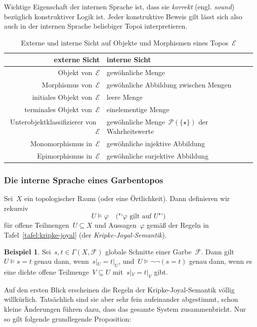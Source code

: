 \documentclass[a4paper,ngerman,12pt]{scrartcl}
\theoremstyle{definition}
\newtheorem{bsp}[defn]{Beispiel}
\theoremstyle{plain}
\theoremstyle{remark}
\newcommand{\E}{\mathcal{E}}
\newcommand{\F}{\mathcal{F}}
\renewcommand{\P}{\mathcal{P}}
\renewcommand{\_}{\mathpunct{.}\,}
\newcommand{\?}{\,{:}\,}
\begin{document}
Wichtige Eigenschaft der internen Sprache ist, dass sie \emph{korrekt} (engl.
\emph{sound}) bezüglich konstruktiver Logik ist. Jeder konstruktive Beweis gilt
lässt sich also auch in der internen Sprache beliebiger Topoi interpretieren.

\begin{table}
  \centering
  \small
  \setlength{\extrarowheight}{0.3em}
  \begin{tabular}{@{}r|l@{}}
    externe Sicht & interne Sicht
    \\\hline
    Objekt von~$\E$ & gewöhnliche Menge \\
    Morphismus von~$\E$ & gewöhnliche Abbildung zwischen Mengen \\
    initiales Objekt von~$\E$ & leere Menge \\
    terminales Objekt von~$\E$ & einelementige Menge \\
    Unterobjektklassifizierer von~$\E$ & gewöhnliche Menge~$\P(\{\star\})$ der
    Wahrheitswerte \\
    Monomorphismus in~$\E$ & gewöhnliche injektive Abbildung \\
    Epimorphismus in~$\E$ & gewöhnliche surjektive Abbildung
  \end{tabular}
  \caption{\label{tafel:externintern}Externe und interne Sicht auf Objekte und
  Morphismen eines Topos~$\E$}
\end{table}


\subsubsection*{Die interne Sprache eines Garbentopos}

Sei~$X$ ein topologischer Raum (oder eine Örtlichkeit). Dann definieren wir rekursiv
\[ U \models \varphi \quad \text{("`$\varphi$ gilt auf~$U$"')} \]
für offene Teilmengen~$U \subseteq X$ und Aussagen~$\varphi$ gemäß
der Regeln in Tafel~\ref{tafel:kripke-joyal} (der
\emph{Kripke-Joyal-Semantik}).

\begin{bsp}Sei~$s,t \in \Gamma(X, \F)$ globale Schnitte einer Garbe~$\F$.
Dann gilt~$U \models s = t$ genau dann, wenn~$s|_U = t|_U$, und~$U \models
\neg\neg(s = t)$ genau dann, wenn es eine dichte offene Teilmenge~$V \subseteq
U$ mit~$s|_V = t|_V$ gibt.\end{bsp}

Auf den ersten Blick erscheinen die Regeln der Kripke-Joyal-Semantik völlig
willkürlich. Tatsächlich sind sie aber sehr fein aufeinander abgestimmt, schon
kleine Änderungen führen dazu, dass das gesamte System zusammenbricht. Nur so
gilt folgende grundlegende Proposition:
\end{document}

